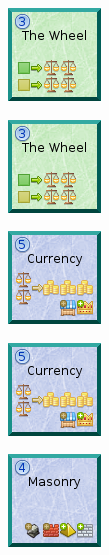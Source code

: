 \documentclass{article}
\begin{document}
\begin{figure}
  \begin{subfigure}{}
    \includegraphics[scale=1]{../rules/png/doe_tech_wheel.png}
  \end{subfigure}
  \begin{subfigure}{}
    \includegraphics[scale=1]{../rules/png/doe_tech_wheel.png}
  \end{subfigure}
  \begin{subfigure}{}
    \includegraphics[scale=1]{../rules/png/doe_tech_currency.png}
  \end{subfigure}
  \begin{subfigure}{}
    \includegraphics[scale=1]{../rules/png/doe_tech_currency.png}
  \end{subfigure}
  \begin{subfigure}{}
    \includegraphics[scale=1]{../rules/png/doe_tech_masonry.png}
  \end{subfigure}
\end{figure}
\end{document}
